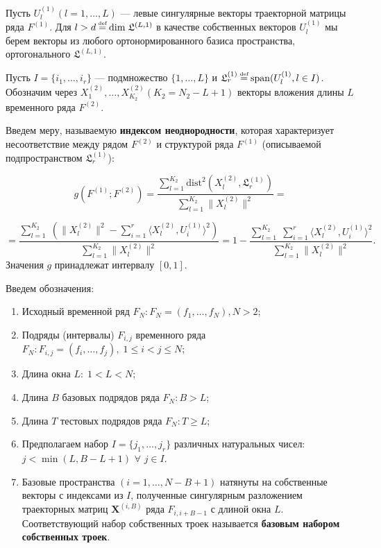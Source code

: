 \documentclass[specialist, substylefile = spbu.rtx,
			   subf, href, 12pt]{disser}
\newcommand\eqdef{\mathrel{\stackrel{\makebox[0pt]{\mbox{\normalfont\tiny def}}}{=}}}
\begin{document}
Пусть $ U_l^{(1)} (l = 1, \dotsc, L) $ --- левые сингулярные векторы траекторной матрицы ряда $ F^{(1)} $. Для $ l > d \eqdef \mathrm{dim} \; \mathfrak{L}^{(L, 1)}$ в качестве собственных векторов $ U_l^{(1)} $ мы берем векторы из любого ортонормированного базиса пространства, ортогонального $\mathfrak{L}^{(L, 1)}$.

Пусть $ I = \{i_1, \dotsc, i_r\} $ --- подмножество $ \{1, \dotsc, L\} $ и $ \mathfrak{L}_r^{(1)} \eqdef \mathrm{span}(U_l^{(1)}, l \in I) $. Обозначим через $ X_1^{(2)}, \dotsc, X_{K_2}^{(2)} (K_2 = N_2 - L + 1) $ векторы вложения длины $ L $ временного ряда $F^{(2)}$.

Введем меру, называемую \textbf{индексом неоднородности}, которая характеризует несоответствие между рядом $F^{(2)}$ и структурой ряда $F^{(1)}$ (описываемой подпространством $ \mathfrak{L}_r^{(1)} $):

$$ g(F^{(1)}; F^{(2)}) = \frac{\sum\limits_{l=1}^{K_2}\mathrm{dist}^2(X_l^{(2)}, \mathfrak{L}_r^{(1)})}{\sum\limits_{l=1}^{K_2}\|X_l^{(2)}\|^2} = $$

\begin{equation}\label{eq:g}
	 =\frac{\sum\limits_{l=1}^{K_2}\;(\|X_l^{(2)}\|^2 - \sum\limits_{i=1}^{r}\langle X_l^{(2)}, U_i^{(1)}\rangle^2)}{\sum\limits_{l=1}^{K_2}\|X_l^{(2)}\|^2} = 1 - \frac{\sum\limits_{l=1}^{K_2}\;\sum\limits_{i=1}^{r}\langle X_l^{(2)}, U_i^{(1)}\rangle^2}{\sum\limits_{l=1}^{K_2}\|X_l^{(2)}\|^2} .
\end{equation}
Значения $g$ принадлежат интервалу $[0, 1]$.

Введем обозначения:
\begin{enumerate}
	
	\item
	Исходный временной ряд $ F_N: F_N = (f_1, \dotsc, f_{N}), N > 2 $;
	
	\item
	Подряды (интервалы) $ F_{i, j} $ временного ряда $ F_N: F_{i, j} = (f_{i}, \dotsc, f_{j}), \; 1 \leq i < j \leq N $;
	
	\item
	Длина окна $ L: \; 1 < L < N $;
	
	\item
	Длина $ B $ базовых подрядов ряда $ F_N: B > L $;
	
	\item
	Длина $ T $ тестовых подрядов ряда $ F_N: T \geq L $;
	
	\item
	Предполагаем набор $ I = \{j_1, \dotsc, j_r\} $ различных натуральных чисел: $ j < \min(L, B - L + 1) $ $ \forall $ $ j \in I $.
	
	\item
	Базовые пространства $ (i = 1, \dotsc, N - B + 1) $ натянуты на собственные векторы с индексами из $ I $, полученные сингулярным разложением траекторных матриц $ \mathbf{X}^{(i, B)} $ ряда $ F_{i, i+B-1} $ с длиной окна $ L $. Соответствующий набор собственных троек называется \textbf{базовым набором собственных троек}.
	
\end{enumerate}
\end{document}
